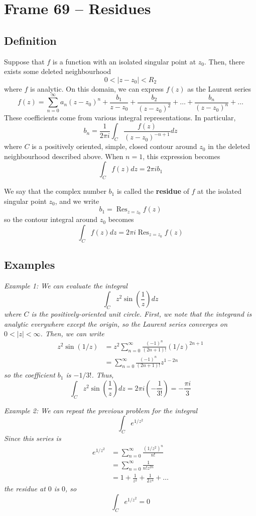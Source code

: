 \documentclass{article}
\renewcommand{\emph}{\textbf}
\DeclareMathOperator{\Res}{Res}
\begin{document}
\clearpage
\section{Frame 69 -- Residues}
\subsection{Definition}
Suppose that $f$ is a function with an isolated singular point at $z_0$. Then, there exists some deleted neighbourhood
\[
	0 < |z - z_0| < R_2
\]
where $f$ is analytic. On this domain, we can express $f(z)$ as the Laurent series
\[
	f(z) = \sum_{n=0}^\infty a_n (z - z_0)^n
	+ \frac{b_1}{z - z_0}
	+ \frac{b_2}{(z - z_0)^2}
	+ \dots
	+ \frac{b_n}{(z - z_0)^n}
	+ \dots
\]
These coefficients come from various integral representations. In particular,
\[
	b_n = \frac{1}{2\pi i} \int_C \frac{f(z)}{(z - z_0)^{-n+1}} dz
\]
where $C$ is a positively oriented, simple, closed contour around $z_0$ in the deleted neighbourhood described above. When $n = 1$, this expression becomes
\[
	\int_C f(z) dz = 2\pi i b_1
\]

We say that the complex number $b_1$ is called the \emph{residue} of $f$ at the isolated singular point $z_0$, and we write
\[
	b_1 = \Res_{z = z_0} f(z)
\]
so the contour integral around $z_0$ becomes
\[
	\int_C f(z) dz = 2\pi i \Res_{z = z_0} f(z)
\]

\subsection{Examples}
\textit{Example 1: We can evaluate the integral
\[
	\int_C z^2 \sin\left( \frac{1}{z} \right) dz
\]
where $C$ is the positively-oriented unit circle. First, we note that the integrand is analytic everywhere except the origin, so the Laurent series converges on $0 < |z| < \infty$. Then, we can write
\begin{align*}
	z^2 \sin(1 / z)
	&= z^2 \sum_{n=0}^\infty \frac{(-1)^n}{(2n+1)!} (1 / z)^{2n+1} \\
	&= \sum_{n=0}^\infty \frac{(-1)^n}{(2n+1)!} z^{1 - 2n}
\end{align*}
so the coefficient $b_1$ is $-1/3!$. Thus,
\[
	\int_C z^2 \sin\left( \frac{1}{z} \right) dz
	= 2\pi i \left( -\frac{1}{3!} \right) 
	= -\frac{\pi i}{3}
\]}

\textit{Example 2: We can repeat the previous problem for the integral
\[
	\int_C e^{1 / z^2}
\]
Since this series is
\begin{align*}
	e^{1 / z^2}
	&= \sum_{n=0}^\infty \frac{(1 / z^2)^n}{n!} \\
	&= \sum_{n=0}^\infty \frac{1}{n! z^{2n}} \\
	&= 1 + \frac{1}{z^2} + \frac{1}{2 z^4} + \dots 
\end{align*}
the residue at $0$ is $0$, so
\[
	\int_C e^{1 / z^2} = 0
\]}
\end{document}
